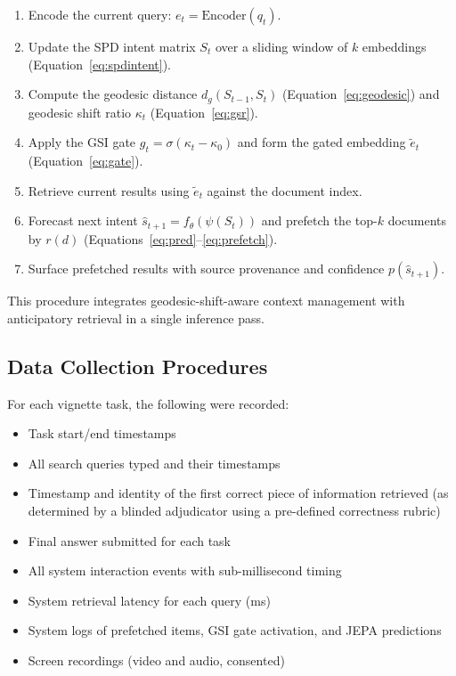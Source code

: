 \documentclass[preprint,12pt]{elsarticle}
\begin{document}
\begin{enumerate}
  \item Encode the current query: $e_t = \text{Encoder}(q_t)$.
  \item Update the SPD intent matrix $S_t$ over a sliding window of $k$ embeddings (Equation~\ref{eq:spdintent}).
  \item Compute the geodesic distance $d_g(S_{t-1},S_t)$ (Equation~\ref{eq:geodesic}) and geodesic shift ratio $\kappa_t$ (Equation~\ref{eq:gsr}).
  \item Apply the GSI gate $g_t=\sigma(\kappa_t-\kappa_0)$ and form the gated embedding $\tilde{e}_t$ (Equation~\ref{eq:gate}).
  \item Retrieve current results using $\tilde{e}_t$ against the document index.
  \item Forecast next intent $\hat{s}_{t+1}=f_\theta(\psi(S_t))$ and prefetch the top-$k$ documents by $r(d)$ (Equations~\ref{eq:pred}--\ref{eq:prefetch}).
  \item Surface prefetched results with source provenance and confidence $p(\hat{s}_{t+1})$.
\end{enumerate}

This procedure integrates geodesic-shift-aware context management with anticipatory retrieval in a single inference pass.

\subsection{Data Collection Procedures}

For each vignette task, the following were recorded:
\begin{itemize}
  \item Task start/end timestamps
  \item All search queries typed and their timestamps
  \item Timestamp and identity of the first correct piece of information retrieved (as determined by a blinded adjudicator using a pre-defined correctness rubric)
  \item Final answer submitted for each task
  \item All system interaction events with sub-millisecond timing
  \item System retrieval latency for each query (ms)
  \item System logs of prefetched items, GSI gate activation, and JEPA predictions
  \item Screen recordings (video and audio, consented)
\end{itemize}
\end{document}

